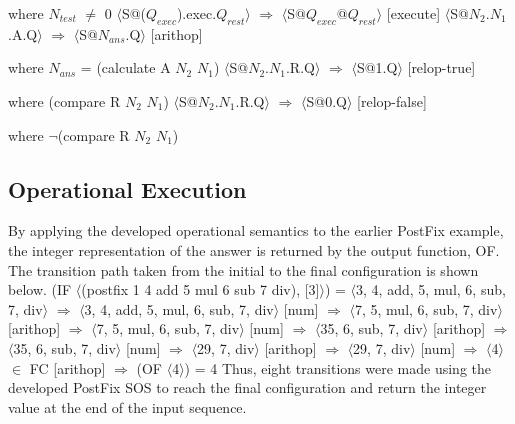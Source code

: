 \documentclass[a4paper,11pt]{article}
\begin{document}
\begin{par} where $N_{test}$ $\neq$ 0 \newline
$\langle$S@($Q_{exec}$).exec.$Q_{rest}$$\rangle$ $\Rightarrow$ $\langle$S@$Q_{exec}$@$Q_{rest}$$\rangle$ \hfill [execute] \newline
$\langle$S@$N_2$.$N_1$.A.Q$\rangle$ $\Rightarrow$ $\langle$S@$N_{ans}$.Q$\rangle$ \hfill [arithop] \end{par}
\begin{par} where $N_{ans}$ = (calculate A $N_2$ $N_1$) \newline
$\langle$S@$N_2$.$N_1$.R.Q$\rangle$ $\Rightarrow$ $\langle$S@1.Q$\rangle$ \hfill [relop-true] \end{par}
\begin{par} where (compare R $N_2$ $N_1$) \newline
$\langle$S@$N_2$.$N_1$.R.Q$\rangle$ $\Rightarrow$ $\langle$S@0.Q$\rangle$ \hfill [relop-false] \end{par}
\begin{par} where $\neg$(compare R $N_2$ $N_1$) \end{par}
\subsection{Operational Execution}
\begin{par} By applying the developed operational semantics to the earlier PostFix example, the integer representation of the answer is returned by the output function, OF. The transition path taken from the initial to the final configuration is shown below. \vspace{5mm} \newline
(IF $\langle$(postfix 1 4 add 5 mul 6 sub 7 div), [3]$\rangle$) \newline
= $\langle$3, 4, add, 5, mul, 6, sub, 7, div$\rangle$ \newline
$\Rightarrow$ $\langle$3, 4, add, 5, mul, 6, sub, 7, div$\rangle$ \hfill [num] \newline
$\Rightarrow$ $\langle$7, 5, mul, 6, sub, 7, div$\rangle$ \hfill [arithop] \newline
$\Rightarrow$ $\langle$7, 5, mul, 6, sub, 7, div$\rangle$ \hfill [num] \newline
$\Rightarrow$ $\langle$35, 6, sub, 7, div$\rangle$ \hfill [arithop] \newline
$\Rightarrow$ $\langle$35, 6, sub, 7, div$\rangle$ \hfill [num] \newline
$\Rightarrow$ $\langle$29, 7, div$\rangle$ \hfill [arithop] \newline
$\Rightarrow$ $\langle$29, 7, div$\rangle$ \hfill [num] \newline
$\Rightarrow$ $\langle$4$\rangle$ $\in$ FC \hfill [arithop] \newline
$\Rightarrow$ (OF $\langle$4$\rangle$) = 4 \vspace{5mm} \newline
Thus, eight transitions were made using the developed PostFix SOS to reach the final configuration and return the integer value at the end of the input sequence. \end{par}
\end{document}
